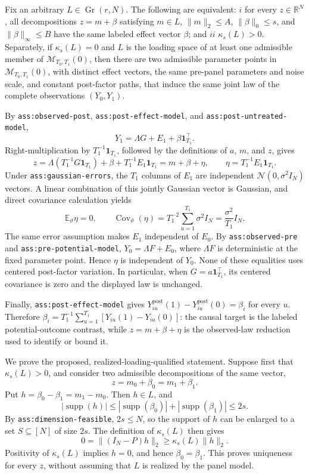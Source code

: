 Fix an arbitrary \(L\in\operatorname{Gr}(r,N)\).  The following are equivalent: \(i\) for every \(z\in\mathbb R^N\), all decompositions \(z=m+\beta\) satisfying \(m\in L\), \(\lVert m\rVert_2\le A\), \(\lVert\beta\rVert_0\le s\), and \(\lVert\beta\rVert_\infty\le B\) have the same labeled effect vector \(\beta\); and \(ii\) \(\kappa_s(L)>0\).  Separately, if \(\kappa_s(L)=0\) and \(L\) is the loading space of at least one admissible member of \(\mathcal M_{T_0,T_1}(0)\), then there are two admissible parameter points in \(\mathcal M_{T_0,T_1}(0)\), with distinct effect vectors, the same pre-panel parameters and noise scale, and constant post-factor paths, that induce the same joint law of the complete observations \((Y_0,Y_1)\).

By \texttt{ass:observed-post}, \texttt{ass:post-effect-model}, and \texttt{ass:post-untreated-model},
\[
 Y_1=\Lambda G+E_1+\beta\mathbf 1_{T_1}^{\top}.
\]
Right-multiplication by \(T_1^{-1}\mathbf 1_{T_1}\), followed by the definitions of \(a\), \(m\), and \(z\), gives
\[
 z=\Lambda\left(T_1^{-1}G\mathbf 1_{T_1}\right)+\beta
      +T_1^{-1}E_1\mathbf 1_{T_1}
   =m+\beta+\eta,
 \qquad
 \eta=T_1^{-1}E_1\mathbf 1_{T_1}.
\]
Under \texttt{ass:gaussian-errors}, the \(T_1\) columns of \(E_1\) are independent \(\mathcal N(0,\sigma^2I_N)\) vectors.  A linear combination of this jointly Gaussian vector is Gaussian, and direct covariance calculation yields
\[
 \mathbb E_\vartheta\eta=0,
 \qquad
 \operatorname{Cov}_\vartheta(\eta)
 =T_1^{-2}\sum_{u=1}^{T_1}\sigma^2I_N
 =\frac{\sigma^2}{T_1}I_N.
\]
The same error assumption makes \(E_1\) independent of \(E_0\).  By \texttt{ass:observed-pre} and \texttt{ass:pre-potential-model}, \(Y_0=\Lambda F+E_0\), where \(\Lambda F\) is deterministic at the fixed parameter point.  Hence \(\eta\) is independent of \(Y_0\).  None of these equalities uses centered post-factor variation.  In particular, when \(G=a\mathbf 1_{T_1}^{\top}\), its centered covariance is zero and the displayed law is unchanged.

Finally, \texttt{ass:post-effect-model} gives \(Y_{iu}^{\mathrm{post}}(1)-Y_{iu}^{\mathrm{post}}(0)=\beta_i\) for every \(u\).  Therefore \(\beta_i=T_1^{-1}\sum_{u=1}^{T_1}[Y_{iu}(1)-Y_{iu}(0)]\): the causal target is the labeled potential-outcome contrast, while \(z=m+\beta+\eta\) is the observed-law reduction used to identify or bound it.

We prove the proposed, realized-loading-qualified statement.  Suppose first that \(\kappa_s(L)>0\), and consider two admissible decompositions of the same vector,
\[
 z=m_0+\beta_0=m_1+\beta_1.
\]
Put \(h=\beta_0-\beta_1=m_1-m_0\).  Then \(h\in L\), and
\[
 |\operatorname{supp}(h)|
 \le |\operatorname{supp}(\beta_0)|+|\operatorname{supp}(\beta_1)|
 \le 2s.
\]
By \texttt{ass:dimension-feasible}, \(2s\le N\), so the support of \(h\) can be enlarged to a set \(S\subseteq[N]\) of size \(2s\).  The definition of \(\kappa_s(L)\) then gives
\[
 0=\lVert(I_N-P)h\rVert_2
   \ge \kappa_s(L)\lVert h\rVert_2.
\]
Positivity of \(\kappa_s(L)\) implies \(h=0\), and hence \(\beta_0=\beta_1\).  This proves uniqueness for every \(z\), without assuming that \(L\) is realized by the panel model.

